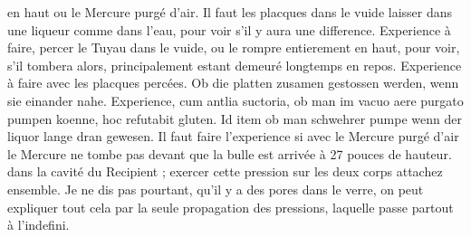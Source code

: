 {%
en haut ou le Mercure purg\'{e}\protect{} d'air.\newline
Il faut les placques dans le vuide\protect{} %
laisser dans une liqueur comme dans l'eau, pour voir s'il y aura une difference.\newline
Experience \`{a} faire, percer le Tuyau dans le vuide\protect{}, ou le rompre entierement en haut, pour voir, s'il tombera alors, principalement estant demeur\'{e} longtemps en repos.\newline 
Experience \`{a} faire avec les placques perc\'{e}es.\newline
Ob die platten zusamen gestossen werden, wenn sie einander nahe.\newline
Experience, cum antlia suctoria, ob man im vacuo aere purgato pumpen koenne, hoc refutabit gluten. Id item ob man schwehrer pumpe wenn der liquor lange dran gewesen.\newline
Il faut faire l'experience si avec le Mercure purg\'{e}\protect{} d'air le Mercure\protect{} ne tombe pas devant que la bulle est arriv\'{e}e \`{a} 27 pouces de hauteur.}
%
dans la cavit\'{e} du Recipient ;  exercer cette pression sur les deux corps attachez ensemble.\pend 
 \pstart {} Je ne dis pas pourtant, qu'il y a des pores dans le verre,  on peut expliquer tout cela par la seule propagation des pressions, laquelle passe partout  \`{a} l'indefini.\pend
